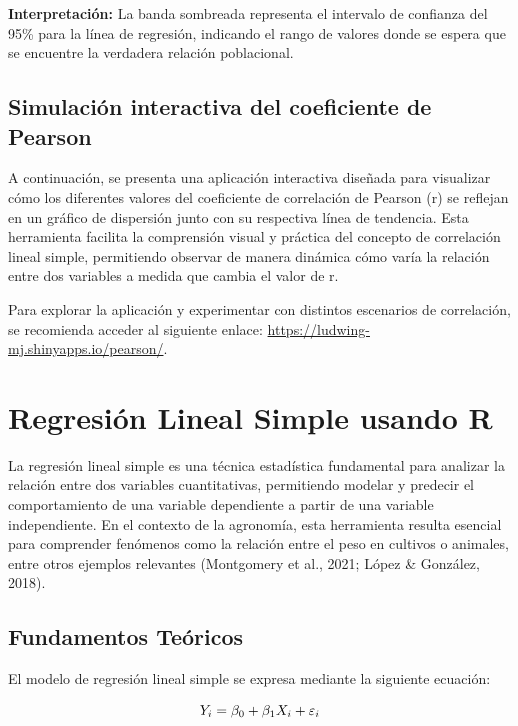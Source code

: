 \documentclass[
  spanish,
  letterpaper,
]{book}
\begin{document}
\textbf{Interpretación:} La banda sombreada representa el intervalo de
confianza del 95\% para la línea de regresión, indicando el rango de
valores donde se espera que se encuentre la verdadera relación
poblacional.

\section{Simulación interactiva del coeficiente de
Pearson}\label{simulaciuxf3n-interactiva-del-coeficiente-de-pearson}

A continuación, se presenta una aplicación interactiva diseñada para
visualizar cómo los diferentes valores del coeficiente de correlación de
Pearson (r) se reflejan en un gráfico de dispersión junto con su
respectiva línea de tendencia. Esta herramienta facilita la comprensión
visual y práctica del concepto de correlación lineal simple, permitiendo
observar de manera dinámica cómo varía la relación entre dos variables a
medida que cambia el valor de r.

Para explorar la aplicación y experimentar con distintos escenarios de
correlación, se recomienda acceder al siguiente enlace:
\url{https://ludwing-mj.shinyapps.io/pearson/}.


\chapter{Regresión Lineal Simple usando
R}\label{regresiuxf3n-lineal-simple-usando-r}

La regresión lineal simple es una técnica estadística fundamental para
analizar la relación entre dos variables cuantitativas, permitiendo
modelar y predecir el comportamiento de una variable dependiente a
partir de una variable independiente. En el contexto de la agronomía,
esta herramienta resulta esencial para comprender fenómenos como la
relación entre el peso en cultivos o animales, entre otros ejemplos
relevantes (Montgomery et al., 2021; López \& González, 2018).

\section{Fundamentos Teóricos}\label{fundamentos-teuxf3ricos-1}

El modelo de regresión lineal simple se expresa mediante la siguiente
ecuación:

\[\huge Y_i = \beta_0 + \beta_1 X_i + \varepsilon_i\]
\end{document}
